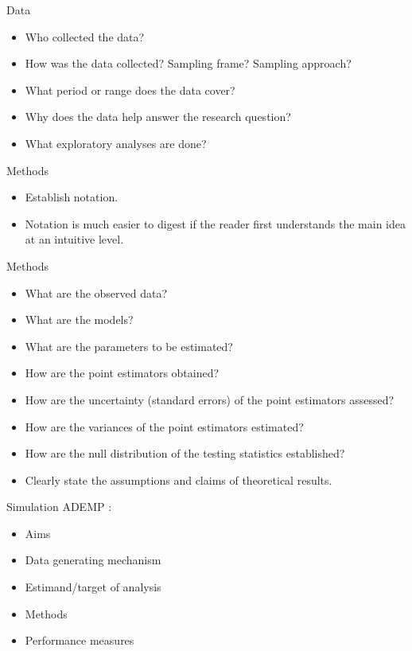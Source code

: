 \documentclass{beamer}
\begin{document}
    
    \begin{frame}{Data}
    \begin{itemize}
        \item Who collected the data?
        \item How was the data collected? Sampling frame? Sampling approach?
        \item What period or range does the data cover?
        \item Why does the data help answer the research question?
        \item What exploratory analyses are done?
    \end{itemize}
    \end{frame}
    
    
    \begin{frame}{Methods}
    \begin{itemize}
        \item Establish notation.
        \item Notation is much easier to digest if the reader first understands the main idea at an intuitive level.
    \end{itemize}
    \end{frame}
    
    
    \begin{frame}{Methods}
    \begin{itemize}
        \item What are the observed data?
        \item What are the models?
        \item What are the parameters to be estimated?
        \item How are the point estimators obtained?
        \item How are the uncertainty (standard errors) of the point estimators assessed?
        \item How are the variances of the point estimators estimated?
        \item How are the null distribution of the testing statistics established?
        \item Clearly state the assumptions and claims of theoretical results.
    \end{itemize}
    \end{frame}
    
    
    \begin{frame}{Simulation}
    ADEMP \citep{Morris2019}:
    \begin{itemize}
        \item Aims
        \item Data generating mechanism
        \item Estimand/target of analysis
        \item Methods
        \item Performance measures
    \end{itemize}
    \end{frame}
    
\end{document}
